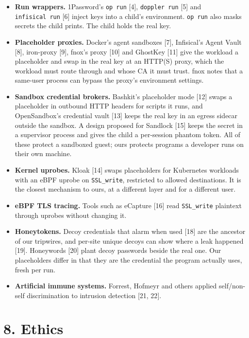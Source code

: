 \documentclass[
  11pt]{article}
\providecommand{\tightlist}{%
  \setlength{\itemsep}{0pt}\setlength{\parskip}{0pt}}
\begin{document}
\begin{itemize}
\tightlist
\item
  \textbf{Run wrappers.} 1Password's
  \texttt{op\ run} {[}4{]},
  \texttt{doppler\ run} {[}5{]} and
  \texttt{infisical\ run} {[}6{]} inject
  keys into a child's environment.
  \texttt{op\ run} also masks secrets
  the child prints. The child holds the
  real key.
\item
  \textbf{Placeholder proxies.} Docker's
  agent sandboxes {[}7{]}, Infisical's
  Agent Vault {[}8{]}, iron-proxy
  {[}9{]}, fnox's proxy {[}10{]} and
  GhostKey {[}11{]} give the workload a
  placeholder and swap in the real key
  at an HTTP(S) proxy, which the
  workload must route through and whose
  CA it must trust. fnox notes that a
  same-user process can bypass the
  proxy's environment settings.
\item
  \textbf{Sandbox credential brokers.}
  Bashkit's placeholder mode {[}12{]}
  swaps a placeholder in outbound HTTP
  headers for scripts it runs, and
  OpenSandbox's credential vault
  {[}13{]} keeps the real key in an
  egress sidecar outside the sandbox. A
  design proposed for Sandlock {[}15{]}
  keeps the secret in a supervisor
  process and gives the child a
  per-session phantom token. All of
  these protect a sandboxed guest; ours
  protects programs a developer runs on
  their own machine.
\item
  \textbf{Kernel uprobes.} Kloak
  {[}14{]} swaps placeholders for
  Kubernetes workloads with an eBPF
  uprobe on \texttt{SSL\_write},
  restricted to allowed destinations. It
  is the closest mechanism to ours, at a
  different layer and for a different
  user.
\item
  \textbf{eBPF TLS tracing.} Tools such
  as eCapture {[}16{]} read
  \texttt{SSL\_write} plaintext through
  uprobes without changing it.
\item
  \textbf{Honeytokens.} Decoy
  credentials that alarm when used
  {[}18{]} are the ancestor of our
  tripwires, and per-site unique decoys
  can show where a leak happened
  {[}19{]}. Honeywords {[}20{]} plant
  decoy passwords beside the real one.
  Our placeholders differ in that they
  are the credential the program
  actually uses, fresh per run.
\item
  \textbf{Artificial immune systems.}
  Forrest, Hofmeyr and others applied
  self/non-self discrimination to
  intrusion detection {[}21, 22{]}.
\end{itemize}

\section*{8. Ethics}\label{ethics}
\end{document}
